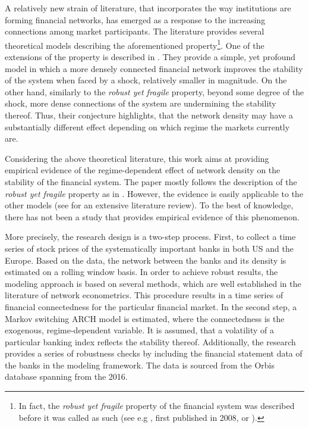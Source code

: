 \documentclass[12pt]{article}
\begin{document}
A relatively new strain of literature, that incorporates the way institutions are forming financial networks, has emerged as a response to the increasing connections among market participants. The literature provides several theoretical models describing the aforementioned property\footnote{In fact, the \textit{robust yet fragile} property of the financial system was described before it was called as such (see e.g \cite{gai10}, first published in 2008, or \cite{gallegati08}).}. One of the extensions of the property is described in \cite{acemoglu13}. They provide a simple, yet profound model in which a more densely connected financial network improves the stability of the system when faced by a shock, relatively smaller in magnitude. On the other hand, similarly to the \textit{robust yet fragile} property, beyond some degree of the shock, more dense connections of the system are undermining the stability thereof. Thus, their conjecture highlights, that the network density may have a substantially different effect depending on which regime the markets currently are. 

Considering the above theoretical literature, this work aims at providing empirical evidence of the regime-dependent effect of network density on the stability of the financial system. The paper mostly follows the description of the \textit{robust yet fragile} property as in \cite{acemoglu13}. However, the evidence is easily applicable to the other models (see \cite{glasserman16} for an extensive literature review). To the best of knowledge, there has not been a study that provides empirical evidence of this phenomenon.

More precisely, the research design is a two-step process. First, to collect a time series of stock prices of the systematically important banks in both US and the Europe. Based on the data, the network between the banks and its density is estimated on a rolling window basis. In order to achieve robust results, the modeling approach is based on several methods, which are well established in the literature of network econometrics. This procedure results in a time series of financial connectedness for the particular financial market. In the second step, a Markov switching ARCH model is estimated, where the connectedness is the exogenous, regime-dependent variable. It is assumed, that a volatility of a particular banking index reflects the stability thereof. Additionally, the research provides a series of robustness checks by including the financial statement data of the banks in the modeling framework. The data is sourced from the Orbis database spanning from the 2016.
\end{document}
